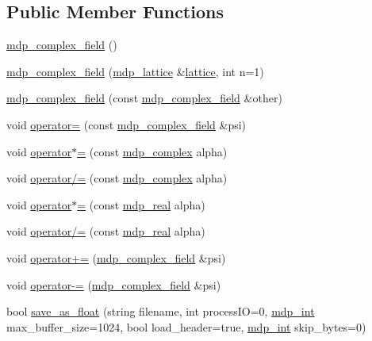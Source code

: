 \subsection*{Public Member Functions}
\begin{DoxyCompactItemize}
\item 
\hyperlink{classmdp__complex__field_aa629a99588ce79fe33fafb6db4f8226a}{mdp\+\_\+complex\+\_\+field} ()
\item 
\hyperlink{classmdp__complex__field_a26b3b0f65609dd18e7438329ff651fd1}{mdp\+\_\+complex\+\_\+field} (\hyperlink{classmdp__lattice}{mdp\+\_\+lattice} \&\hyperlink{classmdp__field_a62ec98dec5fba14fd83549eb2693cf52}{lattice}, int n=1)
\item 
\hyperlink{classmdp__complex__field_a68da5a2521de552a614831c39a14930a}{mdp\+\_\+complex\+\_\+field} (const \hyperlink{classmdp__complex__field}{mdp\+\_\+complex\+\_\+field} \&other)
\item 
void \hyperlink{classmdp__complex__field_ad2b736ae31e3ee1f955c10f6ad40928f}{operator=} (const \hyperlink{classmdp__complex__field}{mdp\+\_\+complex\+\_\+field} \&psi)
\item 
void \hyperlink{classmdp__complex__field_a530256e46fe46c7422cbba8381891636}{operator$\ast$=} (const \hyperlink{classmdp__complex}{mdp\+\_\+complex} alpha)
\item 
void \hyperlink{classmdp__complex__field_ab204658a9026e7936b8725ad4f3172ef}{operator/=} (const \hyperlink{classmdp__complex}{mdp\+\_\+complex} alpha)
\item 
void \hyperlink{classmdp__complex__field_af890e25006822910f411ce10ba7dfc7a}{operator$\ast$=} (const \hyperlink{mdp__global__vars_8h_a69d96b74c791e0bbdb888b3913a69450}{mdp\+\_\+real} alpha)
\item 
void \hyperlink{classmdp__complex__field_a0d2bffa4819135c1ef77c0c9fb22504e}{operator/=} (const \hyperlink{mdp__global__vars_8h_a69d96b74c791e0bbdb888b3913a69450}{mdp\+\_\+real} alpha)
\item 
void \hyperlink{classmdp__complex__field_a2278eac1ee19b8ca1c3c6b7319f6525d}{operator+=} (\hyperlink{classmdp__complex__field}{mdp\+\_\+complex\+\_\+field} \&psi)
\item 
void \hyperlink{classmdp__complex__field_a0385e35ddfd532f15e817dcac1adf212}{operator-\/=} (\hyperlink{classmdp__complex__field}{mdp\+\_\+complex\+\_\+field} \&psi)
\item 
bool \hyperlink{classmdp__complex__field_a27b6db7d432105f65b42c970ea340482}{save\+\_\+as\+\_\+float} (string filename, int process\+IO=0, \hyperlink{mdp__global__vars_8h_aaa1ad9d0dcd2124aa5af0120d9954174}{mdp\+\_\+int} max\+\_\+buffer\+\_\+size=1024, bool load\+\_\+header=true, \hyperlink{mdp__global__vars_8h_aaa1ad9d0dcd2124aa5af0120d9954174}{mdp\+\_\+int} skip\+\_\+bytes=0)

\end{DoxyCompactItemize}
